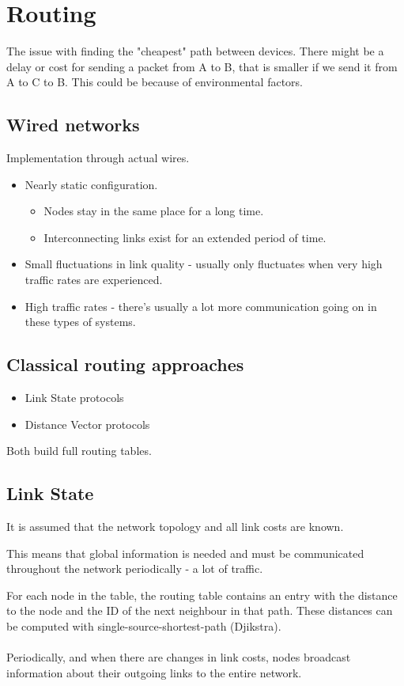 	\section{Routing}
	The issue with finding the "cheapest" path between devices. There might be a delay or cost for sending a packet from A to B, that is smaller if we send it from A to C to B. This could be because of environmental factors. 
	
	\subsection{Wired networks}
	Implementation through actual wires.
	\begin{itemize}
		\item Nearly static configuration.
		\begin{itemize}
			\item Nodes stay in the same place for a long time.
			\item Interconnecting links exist for an extended period of time.
		\end{itemize}
		\item Small fluctuations in link quality - usually only fluctuates when very high traffic rates are experienced.
		\item High traffic rates - there's usually a lot more communication going on in these types of systems.
	\end{itemize}
	
	\subsection{Classical routing approaches}
	\begin{itemize}
		\item Link State protocols
		\item Distance Vector protocols
	\end{itemize}
	Both build full routing tables.
	
	\subsection{Link State}
	It is assumed that the network topology and all link costs are known.
	
	This means that global information is needed and must be communicated throughout the network periodically - a lot of traffic.
	
	For each node in the table, the routing table contains an entry with the distance to the node and the ID of the next neighbour in that path. These distances can be computed with single-source-shortest-path (Djikstra).
	\\
	\\
	Periodically, and when there are changes in link costs, nodes broadcast information about their outgoing links to the entire network.
	
